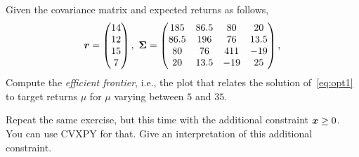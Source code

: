\documentclass{article}
\begin{document}
Given the covariance matrix and expected returns as follows,
\begin{equation*}
 \vct{r} = \begin{pmatrix}
            14\\12\\15\\7
           \end{pmatrix}, \ 
\mtx{\Sigma} = \begin{pmatrix}
                185 & 86.5 & 80 & 20\\
                86.5 & 196 & 76 & 13.5\\
                80 & 76 & 411 & -19\\
                20 & 13.5 & -19 & 25
               \end{pmatrix},
\end{equation*}
Compute the {\em efficient frontier}, i.e., the plot that relates the solution of~\eqref{eq:opt1} to target returns $\mu$ for $\mu$ varying between $5$ and $35$.

Repeat the same exercise, but this time with the additional constraint $\bm{x}\geq 0$. You can use CVXPY for that. Give an interpretation of this additional constraint.
\end{document}
